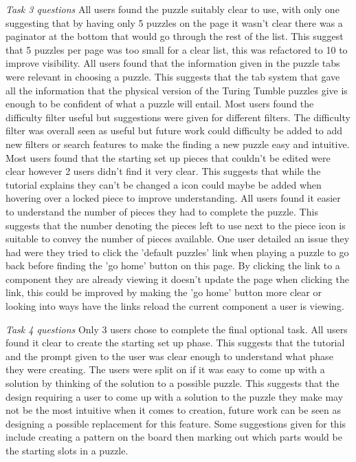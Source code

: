 \documentclass{l4proj}
\begin{document}
\emph{Task 3 questions}
All users found the puzzle suitably clear to use, with only one suggesting that by having only 5 puzzles on the page it wasn't clear there was a paginator at the bottom that would go through the rest of the list. This suggest that 5 puzzles per page was too small for a clear list, this was refactored to 10 to improve visibility. All users found that the information given in the puzzle tabs were relevant in choosing a puzzle. This suggests that the tab system that gave all the information that the physical version of the Turing Tumble puzzles give is enough to be confident of what a puzzle will entail. Most users found the difficulty filter useful but suggestions were given for different filters. The difficulty filter was overall seen as useful but future work could difficulty be added to add new filters or search features to make the finding a new puzzle easy and intuitive. Most users found that the starting set up pieces that couldn't be edited were clear however 2 users didn't find it very clear. This suggests that while the tutorial explains they can't be changed a icon could maybe be added when hovering over a locked piece to improve understanding. All users found it easier to understand the number of pieces they had to complete the puzzle. This suggests that the number denoting the pieces left to use next to the piece icon is suitable to convey the number of pieces available. One user detailed an issue they had were they tried to click the 'default puzzles' link when playing a puzzle to go back before finding the 'go home' button on this page. By clicking the link to a component they are already viewing it doesn't update the page when clicking the link, this could be improved by making the 'go home' button more clear or looking into ways have the links reload the current component a user is viewing.

\emph{Task 4 questions}
Only 3 users chose to complete the final optional task. All users found it clear to create the starting set up phase. This suggests that the tutorial and the prompt given to the user was clear enough to understand what phase they were creating. The users were split on if it was easy to come up with a solution by thinking of the solution to a possible puzzle. This suggests that the design requiring a user to come up with a solution to the puzzle they make may not be the most intuitive when it comes to creation, future work can be seen as designing a possible replacement for this feature. Some suggestions given for this include creating a pattern on the board then marking out which parts would be the starting slots in a puzzle.
\end{document}

